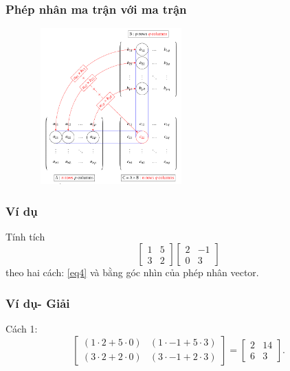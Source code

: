 \begin{frame}
    \frametitle{Phép nhân ma trận với ma trận}
\begin{figure}[H]
    \centering
    \includegraphics[width=6cm, height=6cm]{Slides/Figure/matricemultiplication.png}
\end{figure}
\end{frame}
\begin{frame}
    \frametitle{Ví dụ}
    Tính tích \[\begin{bmatrix}
    1&5\\ 3&2
\end{bmatrix}\begin{bmatrix}
    2&-1\\ 0&3
\end{bmatrix}\] theo hai cách: \eqref{eq4} và bằng góc nhìn của phép nhân vector.
\end{frame}
\begin{frame}
    \frametitle{Ví dụ- Giải}
    Cách 1: \[\begin{bmatrix}
    (1\cdot 2+5\cdot 0)&(1\cdot -1+5\cdot 3)\\
   ( 3\cdot 2+2\cdot 0)&(3\cdot -1+2\cdot 3)
\end{bmatrix}=\begin{bmatrix}
    2&14\\
    6&3
\end{bmatrix}.\]
\end{frame}
